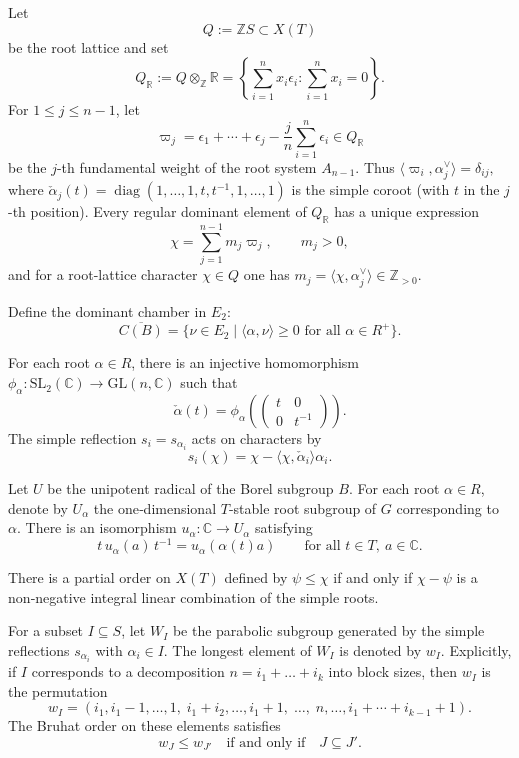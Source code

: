 \documentclass[12pt, reqno]{amsart}
\theoremstyle{plain}
\numberwithin{equation}{section}
\theoremstyle{definition}
\begin{document}
Let \[ Q:=\mathbb ZS\subset X(T) \] be the root lattice and set \[ Q_{\mathbb R}:=Q\otimes_{\mathbb Z}\mathbb R = \left\{ \sum_{i=1}^n x_i\epsilon_i: \sum_{i=1}^n x_i=0 \right\}. \] For \(1\le j\le n-1\), let \[ \varpi_j = \epsilon_1+\cdots+\epsilon_j -\frac{j}{n}\sum_{i=1}^n\epsilon_i \in Q_{\mathbb R} \] be the \(j\)-th fundamental weight of the root system \(A_{n-1}\). Thus $ \langle\varpi_i,\alpha_j^\vee\rangle=\delta_{ij},$ where $\check{\alpha}_j(t) = \operatorname{diag}(1,\dots,1,t,t^{-1},1,\dots,1)$ is the simple coroot (with $t$ in the $j$-th position). Every regular dominant element of \(Q_{\mathbb R}\) has a unique expression \[ \chi=\sum_{j=1}^{n-1}m_j\varpi_j, \qquad m_j>0, \] and for a root-lattice character \(\chi\in Q\) one has $m_j=\langle\chi,\alpha_j^\vee\rangle\in\mathbb Z_{>0}.$


Define the dominant chamber in \(E_2\):
\[
\overline{C(B)} = \{ \nu \in E_2 \mid \langle \alpha, \nu \rangle \ge 0 \text{ for all } \alpha \in R^+ \}.
\]

For each root \(\alpha \in R\), there is an injective homomorphism \(\phi_\alpha : \mathrm{SL}_2(\mathbb{C}) \to \mathrm{GL}(n,\mathbb{C})\) such that
\[
\check{\alpha}(t) = \phi_\alpha\!\left( \begin{pmatrix} t & 0 \\ 0 & t^{-1} \end{pmatrix} \right).
\]
The simple reflection \(s_i = s_{\alpha_i}\) acts on characters by
\[
s_i(\chi) = \chi - \langle \chi, \check{\alpha}_i \rangle \alpha_i.
\]

Let \(U\) be the unipotent radical of the Borel subgroup \(B\). For each root \(\alpha \in R\), denote by \(U_\alpha\) the one‑dimensional \(T\)-stable root subgroup of \(G\) corresponding to \(\alpha\). There is an isomorphism \(u_\alpha : \mathbb{C} \to U_\alpha\) satisfying
\[
t \, u_\alpha(a) \, t^{-1} = u_\alpha( \alpha(t) a ) \qquad \text{for all } t \in T,\ a \in \mathbb{C}.
\]

There is a partial order on \(X(T)\) defined by \(\psi \le \chi\) if and only if \(\chi - \psi\) is a non‑negative integral linear combination of the simple roots.

For a subset $I \subseteq S$, let $W_I$ be the parabolic subgroup generated by the simple reflections $s_{\alpha_i}$ with $\alpha_i \in I$. The longest element of $W_I$ is denoted by $w_{I}$. Explicitly, if $I$ corresponds to a decomposition $n = i_1 + \dots + i_k$ into block sizes, then $w_{I}$ is the permutation
\[
w_{I} = (i_1,i_1-1,\dots,1,\; i_1+i_2,\dots,i_1+1,\; \dots,\; n,\dots,i_1+\cdots+i_{k-1}+1).
\] The Bruhat order on these elements satisfies
$$
w_J \leq w_{J'} \quad \text{if and only if} \quad J \subseteq J'.
$$
\end{document}

